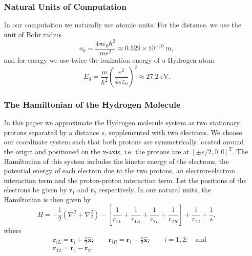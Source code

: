 \documentclass[twoside]{article}
\newcommand{\unit}[1]{\ensuremath{\; \mathrm{#1}}}
\newcommand{\bfr}{\ensuremath{\mathbf{r}}}
\begin{document}
\subsubsection*{Natural Units of Computation}
In our computation we naturally use atomic units. For the distance, we use the unit of Bohr radius
\begin{equation}
a_0 = \frac{4\pi \varepsilon_0 \hbar^2}{me^2} \approx 0.529 \times 10^{-10} \unit{m},
\end{equation}
and for energy we use twice the ionization energy of a Hydrogen atom
\begin{equation}
E_0 = \frac{m}{\hbar^2} \left(\frac{e^2}{4\pi \varepsilon_0}\right)^2 \approx 27.2 \unit{eV}. 
\end{equation}

\subsubsection*{The Hamiltonian of the Hydrogen Molecule}
In this paper we approximate the Hydrogen molecule system as two stationary protons separated by a distance $s$, supplemented with two electrons. We choose our coordinate system such that both protons are symmetrically located around the origin and positioned on the x-axis, i.e. the protons are at $[\pm s/2,0,0]^T$. The Hamiltonian of this system includes the kinetic energy of the electrons, the potential energy of each electron due to the two protons, an electron-electron interaction term and the proton-proton interaction term. Let the positions of the electrons be given by $\bfr_1$ and $\bfr_2$ respectively. In our natural units, the Hamiltonian is then given by
\begin{equation}
H = -\frac{1}{2} (\nabla_1^2 + \nabla_2^2) - \left[ \frac{1}{r_{1L}} + \frac{1}{r_{1R}} + \frac{1}{r_{2L}} + \frac{1}{r_{2R}}  \right] + \frac{1}{r_{12}} + \frac{1}{s},
\end{equation}
where
\begin{equation}
\begin{split}
&\bfr_{iL} = \bfr_i + \frac{s}{2} \mathbf{\hat{x}}; \quad\quad \bfr_{iR} = \bfr_i - \frac{s}{2} \mathbf{\hat{x}}; \quad \quad i=1,2; \quad \mbox{and} \\
&\bfr_{12} = \bfr_1 - \bfr_2.
\end{split}
\end{equation}
\end{document}
